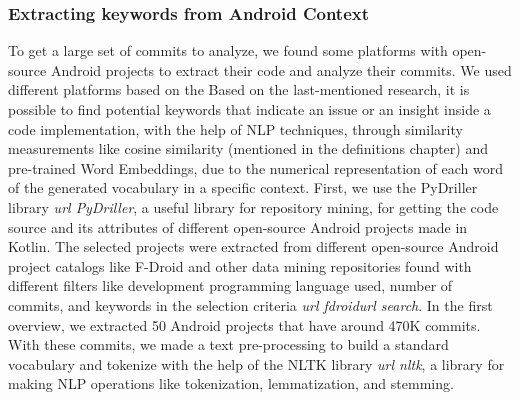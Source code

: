 \subsubsection{Extracting keywords from Android Context}
To get a large set of commits to analyze, we found some platforms with open-source Android projects to extract their code and analyze their commits. We used different platforms based on the
Based on the last-mentioned research, it is possible to find potential keywords that indicate an issue or an insight inside a code implementation, with the help of NLP techniques, through similarity measurements like cosine similarity (mentioned in the definitions chapter) and pre-trained Word Embeddings, due to the numerical representation of each word of the generated vocabulary in a specific context. First, we use the PyDriller library \emph{url PyDriller}, a useful library for repository mining, for getting the code source and its attributes of different open-source Android projects made in Kotlin. The selected projects were extracted from different open-source Android project catalogs like F-Droid and other data mining repositories found with different filters like development programming language used, number of commits, and keywords in the selection criteria \emph{url fdroid}\emph{url search}. In the first overview, we extracted 50 Android projects that have around 470K commits. With these commits, we made a text pre-processing to build a standard vocabulary and tokenize with the help of the NLTK library \emph{url nltk}, a library for making NLP operations like tokenization, lemmatization, and stemming.

